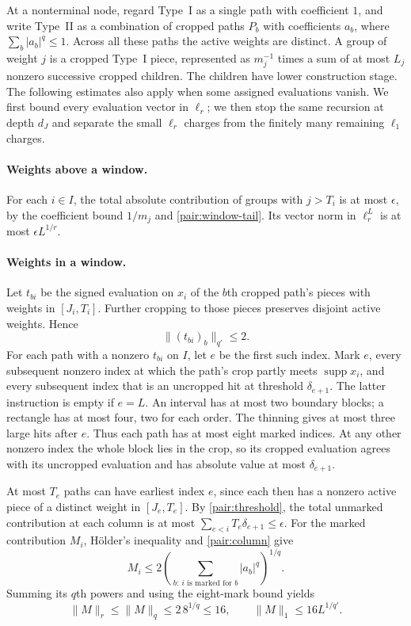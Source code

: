 At a nonterminal node, regard Type~I as a single path with coefficient
$1$, and write Type~II as a combination of cropped paths $P_b$ with
coefficients $a_b$, where $\sum_b|a_b|^q\le1$.  Across all these paths the
active weights are distinct.  A group of weight $j$ is a cropped Type~I
piece, represented as $m_j^{-1}$ times a sum of at most $L_j$ nonzero
successive cropped children.  The children have lower construction stage.
The following estimates also apply when some assigned evaluations vanish.
We first bound every evaluation vector in $\ell_r$; we then stop the
same recursion at depth $d_J$ and separate the small $\ell_r$ charges
from the finitely many remaining $\ell_1$ charges.

\paragraph{Weights above a window.}
For each $i\in I$, the total absolute contribution of groups with $j>T_i$
is at most $\epsilon$, by the coefficient bound $1/m_j$ and
\eqref{pair:window-tail}.  Its vector norm in $\ell_r^L$ is at most
$\epsilon L^{1/r}$.

\paragraph{Weights in a window.}
Let $t_{bi}$ be the signed evaluation on $x_i$ of the $b$th cropped path's
pieces with weights in $[J_i,T_i]$.  Further cropping to those pieces
preserves disjoint active weights.  Hence
\begin{equation}\label{pair:column}
 \|(t_{bi})_b\|_{q'}\le2.
\end{equation}
For each path with a nonzero $t_{bi}$ on $I$, let $e$ be the first such
index.  Mark $e$, every subsequent nonzero index at which the path's crop
partly meets $\operatorname{supp}x_i$, and every subsequent index that is
an uncropped hit at threshold $\delta_{e+1}$.  The latter instruction is
empty if $e=L$.  An interval has at most two boundary blocks; a rectangle
has at most four, two for each order.  The thinning gives at most three
large hits after $e$.  Thus each path has at most eight marked indices.
At any other nonzero index the whole block lies in the crop, so its
cropped evaluation agrees with its uncropped evaluation and has absolute
value at most $\delta_{e+1}$.

At most $T_e$ paths can have earliest index $e$, since each then has a
nonzero active piece of a distinct weight in $[J_e,T_e]$.  By
\eqref{pair:threshold}, the total unmarked contribution at each column is
at most $\sum_{e<i}T_e\delta_{e+1}\le\epsilon$.
For the marked contribution $M_i$, H\"older's inequality and
\eqref{pair:column} give
\[
 M_i\le2\left(\sum_{b:\ i\text{ is marked for }b}|a_b|^q\right)^{1/q}.
\]
Summing its $q$th powers and using the eight-mark bound yields
\begin{equation}\label{pair:marked}
 \|M\|_r\le\|M\|_q\le2\,8^{1/q}\le16,
 \qquad \|M\|_1\le16L^{1/q'}.
\end{equation}

